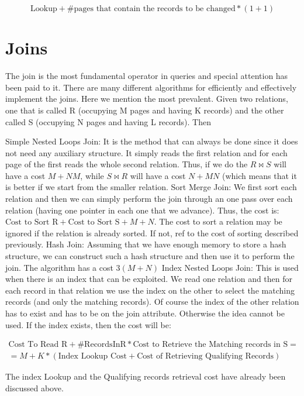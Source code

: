 \documentclass[11pt]{article}
\begin{document}
$$
\text{Lookup} + \text{\#pages that contain the records to be changed} * (1 + 1)
$$

\section{Joins}

The join is the most fundamental operator in queries and special attention has been paid to it. There are many different algorithms for efficiently and effectively implement the joins. Here we mention the most prevalent. Given two relations, one that is called R (occupying M pages and having K records) and the other called S (occupying N pages and having L records). Then

Simple Nested Loops Join: It is the method that can always be done since it does not need any auxiliary structure. It simply reads the first relation and for each page of the first reads the whole second relation. Thus, if we do the $R\bowtie S$ will have a cost $M + NM$, while $S \bowtie R$ will have a cost $N + MN$ (which means that it is better if we start from the smaller relation.
Sort Merge Join: We first sort each relation and then we can simply perform the join through an one pass over each relation (having one pointer in each one that we advance). Thus, the cost is: $\text{Cost to Sort R} + \text{Cost to Sort S} + M + N$. The cost to sort a relation may be ignored if the relation is already sorted. If not, ref to the cost of sorting described previously.
Hash Join: Assuming that we have enough memory to store a hash structure, we can construct such a hash structure and then use it to perform the join. The algorithm has a cost $3(M+N)$
Index Nested Loops Join: This is used when there is an index that can be exploited. We read one relation and then for each record in that relation we use the index on the other to select the matching records (and only the matching records). Of course the index of the other relation has to exist and has to be on the join attribute. Otherwise the idea cannot be used. If the index exists, then the cost will be:

\begin{align*}
\text{Cost To Read R} + \text{\#RecordsInR} * \text{Cost to Retrieve the Matching records in S} = \\
 = M + K * (\text{Index Lookup Cost} + \text{Cost of Retrieving Qualifying Records})
\end{align*}

The index Lookup and the Qualifying records retrieval cost have already been discussed above.
\end{document}
